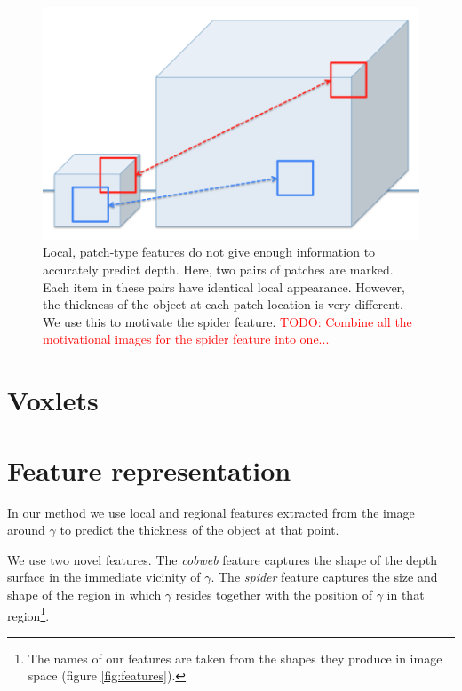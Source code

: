 \documentclass[10pt,twocolumn,letterpaper]{article}
\newcommand{\pixelidx}{\gamma}
\newcommand{\todo}[1]{\textcolor{red}{TODO: #1}}
\begin{document}
\begin{figure}
  \centering 
  \includegraphics[width=0.9\columnwidth]{patch_sizes.png}

  \caption{Local, patch-type features do not give enough information to accurately predict depth. Here, two pairs of patches are marked. Each item in these pairs have identical local appearance. However, the thickness of the object at each patch location is very different. We use this to motivate the spider feature.
  \todo{Combine all the motivational images for the spider feature into one...}}
  \label{fig:patch_problems}
\end{figure}


\section{Voxlets}


\section{Feature representation}

In our method we use local and regional features extracted from the image around $\pixelidx$ to predict the thickness of the object at that point.

We use two novel features. 
The \emph{cobweb} feature captures the shape of the depth surface in the immediate vicinity of $\pixelidx$. 
The \emph{spider} feature captures the size and shape of the region in which $\pixelidx$ resides together with the position of $\pixelidx$ in that region\footnote{The names of our features are taken from the shapes they produce in image space (figure \ref{fig:features}).}.
\end{document}
